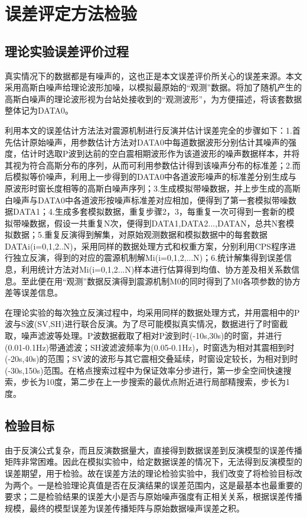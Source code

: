 \section{误差评定方法检验}

\subsection{理论实验误差评价过程}
真实情况下的数据都是有噪声的，这也正是本文误差评价所关心的误差来源。本文采用高斯白噪声给理论波形加噪，以模拟最原始的“观测”数据。将加了随机产生的高斯白噪声的理论波形视为台站处接收到的“观测波形”，为方便描述，将该套数据整体记为DATA0。

利用本文的误差估计方法法对震源机制进行反演并估计误差完全的步骤如下：1.首先估计原始噪声，用参数估计方法对DATA0中每道数据波形分别估计其噪声的强度，估计时选取P波到达前的空白震相期波形作为该道波形的噪声数据样本，并将其视为符合高斯分布的序列，从而可利用参数估计得到该噪声分布的标准差；2.而后模拟等价噪声，利用上一步得到的DATA0中各道波形噪声的标准差分别生成与原波形时窗长度相等的高斯白噪声序列；3.生成模拟带噪数据，并上步生成的高斯白噪声与DATA0中各道波形按噪声标准差对应相加，便得到了第一套模拟带噪数据DATA1；4.生成多套模拟数据，重复步骤2，3，每重复一次可得到一套新的模拟带噪数据，假设一共重复N次，便得到DATA1,DATA2...,DATAN，总共N套模拟数据；5.重复反演得到解集，对原始观测数据和模拟数据中的每套数据DATAi(i=0,1,2..N)，采用同样的数据处理方式和权重方案，分别利用CPS程序进行独立反演，得到的对应的震源机制解Mi(i=0,1,2,...N)；6.统计解集得到误差信息，利用统计方法对Mi(i=0,1,2...N)样本进行估算得到均值、协方差及相关系数信息。至此便在用“观测”数据反演得到震源机制M0的同时得到了M0各项参数的协方差等误差信息。

在理论实验的每次独立反演过程中，均采用同样的数据处理方式，并用震相中的P波与S波(SV,SH)进行联合反演。为了尽可能模拟真实情况，数据进行了时窗截取，噪声滤波等处理。P波数据截取了相对P波到时(-10s,30s)的时窗，并进行(0.01-0.1Hz)带通滤波；SH波滤波频率为(0.05-0.1Hz)，时窗选为相对其震相到时(-20s,40s)的范围；SV波的波形与其它震相交叠延续，时窗设定较长，为相对到时(-30s,150s)范围。在格点搜索过程中为保证效率分步进行，第一步全空间快速搜索，步长为10度，第二步在上一步搜索的最优点附近进行局部精搜索，步长为1度。

\subsection{检验目标}
由于反演公式复杂，而且反演数据量大，直接得到数据误差到反演模型的误差传播矩阵非常困难。因此在模拟实验中，给定数据误差的情况下，无法得到反演模型的误差期望，用于检验。故在误差方法的理论检验实验中，我们改变了将检验目标改为两个。一是检验理论真值是否在反演结果的误差范围内，这是最基本也最重要的要求；二是检验结果的误差大小是否与原始噪声强度有正相关关系，根据误差传播规模，最终的模型误差为误差传播矩阵与原始数据噪声误差之积。

